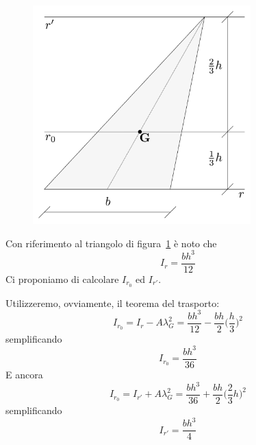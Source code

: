 \begin{figure}[ht]
\centering
\includegraphics[width=0.75\textwidth]{Immagini/Parte_2/Figura2_8/Figura2_8.pdf}
\caption{}
\label{figura2-8}
\end{figure}
Con riferimento al triangolo di figura~\ref{figura2-8} è noto che 
\begin{equation*}
I_r = \frac{bh^{3}}{12}
\end{equation*}
Ci proponiamo di calcolare $I_{r_0}$ ed $I_{r'}$. 

\noindent Utilizzeremo, ovviamente, il teorema del trasporto:
\begin{equation*}
I_{r_0} = I_r - A\lambda_{G}^{2} = \frac{bh^{3}}{12}-\frac{bh}{2}\biggl(\frac{h}{3}\biggr)^2
\end{equation*}
semplificando
\begin{equation}
\boxed{I_{r_0} = \frac{bh^{3}}{36}}
\end{equation}
E ancora 
\begin{equation*}
I_{r_0} = I_{r'} + A\lambda_{G}^{2} = \frac{bh^{3}}{36}+\frac{bh}{2}\biggl(\frac{2}{3}h\biggr)^2
\end{equation*}
semplificando
\begin{equation*}
\boxed{I_{r'} = \frac{bh^{3}}{4}}
\end{equation*}
\clearpage
